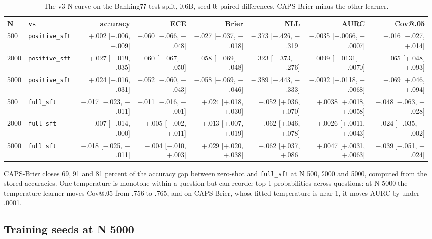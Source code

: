 \documentclass[10pt,letterpaper]{article}
\theoremstyle{plain}
\begin{document}
\begin{table}[H]
\centering
\footnotesize
\setlength{\tabcolsep}{3pt}
\caption{The v3 N-curve on the Banking77 test split, 0.6B, seed 0: paired differences, CAPS-Brier minus the other learner.}
\label{tab:A1b}
\begin{adjustbox}{max width=\textwidth}
\begin{tabular}{llrrrrrr}
\toprule
N & vs & accuracy & ECE & Brier & NLL & AURC & Cov@.05 \\
\midrule
500 & \texttt{positive\_sft} & +.002 [$-$.006, +.009] & $-$.060 [$-$.066, $-$.048] & $-$.027 [$-$.037, $-$.018] & $-$.373 [$-$.426, $-$.319] & $-$.0035 [$-$.0066, $-$.0007] & $-$.016 [$-$.027, +.014] \\
2000 & \texttt{positive\_sft} & +.027 [+.019, +.035] & $-$.060 [$-$.067, $-$.050] & $-$.058 [$-$.069, $-$.048] & $-$.323 [$-$.373, $-$.276] & $-$.0099 [$-$.0131, $-$.0070] & +.065 [+.048, +.093] \\
5000 & \texttt{positive\_sft} & +.024 [+.016, +.031] & $-$.052 [$-$.060, $-$.043] & $-$.058 [$-$.069, $-$.046] & $-$.389 [$-$.443, $-$.333] & $-$.0092 [$-$.0118, $-$.0068] & +.069 [+.046, +.094] \\
500 & \texttt{full\_sft} & $-$.017 [$-$.023, $-$.011] & $-$.011 [$-$.016, $-$.001] & +.024 [+.018, +.030] & +.052 [+.036, +.070] & +.0038 [+.0018, +.0058] & $-$.048 [$-$.063, $-$.028] \\
2000 & \texttt{full\_sft} & $-$.007 [$-$.014, +.000] & +.005 [$-$.002, +.011] & +.013 [+.007, +.019] & +.062 [+.046, +.078] & +.0026 [+.0011, +.0043] & $-$.024 [$-$.035, $-$.002] \\
5000 & \texttt{full\_sft} & $-$.018 [$-$.025, $-$.011] & $-$.004 [$-$.010, +.003] & +.029 [+.020, +.038] & +.062 [+.037, +.086] & +.0047 [+.0031, +.0063] & $-$.039 [$-$.051, $-$.024] \\
\bottomrule
\end{tabular}
\end{adjustbox}
\end{table}

CAPS-Brier closes 69, 91 and 81 percent of the accuracy gap between zero-shot and \texttt{full\_sft} at N 500, 2000 and 5000, computed from the stored accuracies. One temperature is monotone within a question but can reorder top-1 probabilities across questions: at N 5000 the temperature learner moves Cov@.05 from .756 to .765, and on CAPS-Brier, whose fitted temperature is near 1, it moves AURC by under .0001.

\subsection{Training seeds at N 5000}\label{sec:A2}
\end{document}
